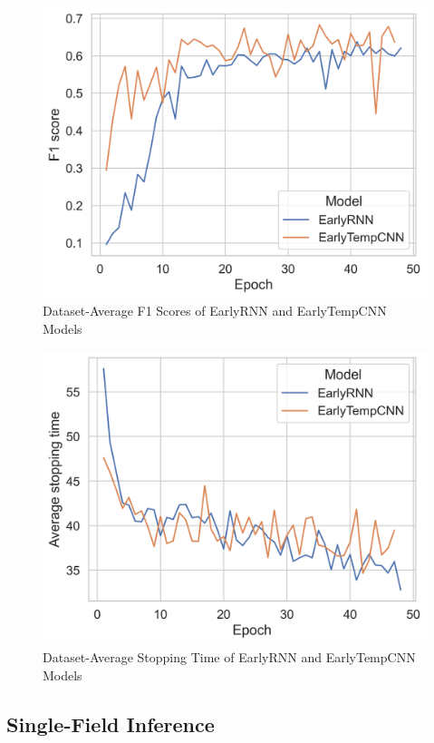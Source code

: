 \documentclass{article}
\begin{document}
\begin{figure}
    \centering
    \includegraphics[width=\textwidth]{images/early_fscores.png}
    \caption{Dataset-Average F1 Scores of EarlyRNN and EarlyTempCNN Models}
    \label{Figure 4.2.1}
\end{figure}

\begin{figure}
    \centering
    \includegraphics[width=\textwidth]{images/early_stopping_time.png}
    \caption{Dataset-Average Stopping Time of EarlyRNN and EarlyTempCNN Models}
    \label{Figure 4.2.2}
\end{figure}

\subsection{Single-Field Inference}
\end{document}
